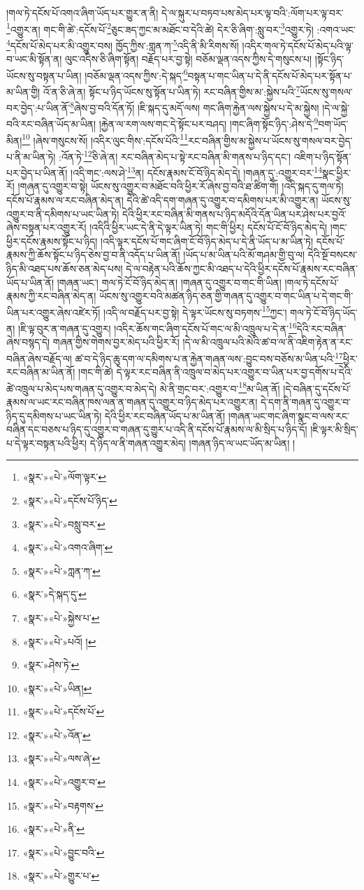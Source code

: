 །གལ་ཏེ་དངོས་པོ་འགའ་ཞིག་ཡོད་པར་གྱུར་ན་ནི། དེ་ལ་སྐུར་པ་བཏབ་པས་མེད་པར་ལྟ་བའི་:ལོག་པར་ལྟ་བར་\footnote{«སྣར་»«པེ་»ལོག་ལྟར་}འགྱུར་ན། གང་གི་ཚེ་:དངོས་པོ་\footnote{«སྣར་»«པེ་»དངོས་པོ་ཉིད་}ཅུང་ཟད་ཀྱང་མ་མཐོང་བ་དེའི་ཚེ། དེར་ཅི་ཞིག་:སླུ་བར་\footnote{«སྣར་»«པེ་»བསླུ་བར་}འགྱུར་ཏེ། :འགའ་ཡང་\footnote{«སྣར་»«པེ་»འགའ་ཞིག་}དངོས་པོ་མེད་པར་མི་འགྱུར་བས། ཁྱོད་ཀྱིས་:གླན་ཀ་\footnote{«སྣར་»«པེ་»ཀླན་ཀ་}འདི་ནི་མི་རིགས་སོ། །འདིར་གལ་ཏེ་དངོས་པོ་མེད་པའི་ལྟ་བ་ཡང་མི་སྟོན་ན། ལུང་འདིས་ཅི་ཞིག་སྟོན། བརྗོད་པར་བྱ་སྟེ། བཅོམ་ལྡན་འདས་ཀྱིས་དེ་གསུངས་པ། །སྟོང་ཉིད་ཡོངས་སུ་བསྟན་པ་ཡིན། །བཅོམ་ལྡན་འདས་ཀྱིས་:དེ་སྐད་\footnote{«སྣར་»དེ་སྐད་དུ་}བསྟན་པ་གང་ཡིན་པ་དེ་ནི་དངོས་པོ་མེད་པར་སྟོན་པ་མ་ཡིན་གྱི། འོ་ན་ཅི་ཞེ་ན། སྟོང་པ་ཉིད་ཡོངས་སུ་སྟོན་པ་ཡིན་ཏེ། རང་བཞིན་གྱིས་མ་:སྐྱེས་པའི་\footnote{«སྣར་»«པེ་»སྐྱེས་པ་}ཡོངས་སུ་གསལ་བར་བྱེད་:པ་ཡིན་ནོ་\footnote{«སྣར་»«པེ་»པའོ། །}ཞེས་བྱ་བའི་དོན་ཏོ། །ཇི་སྐད་དུ་མདོ་ལས། གང་ཞིག་རྐྱེན་ལས་སྐྱེས་པ་དེ་མ་སྐྱེས། །དེ་ལ་སྐྱེ་བའི་རང་བཞིན་ཡོད་མ་ཡིན། །རྐྱེན་ལ་རག་ལས་གང་དེ་སྟོང་པར་བཤད། །གང་ཞིག་སྟོང་ཉིད་:ཤེས་དེ་\footnote{«སྣར་»ཤེས་ཏེ་}བག་ཡོད་མིན།\footnote{«སྣར་»«པེ་»ཡིན།} །ཞེས་གསུངས་སོ། །འདིར་ལུང་གིས་:དངོས་པོའི་\footnote{«སྣར་»«པེ་»དངོས་པོ་}རང་བཞིན་གྱིས་མ་སྐྱེས་པ་ཡོངས་སུ་གསལ་བར་བྱེད་པ་ནི་མ་ཡིན་ཏེ། :འོན་ཏེ་\footnote{«སྣར་»«པེ་»འོན་}ཅི་ཞེ་ན། རང་བཞིན་མེད་པ་སྟེ་རང་བཞིན་མི་གནས་པ་ཉིད་དང་། འཇིག་པ་ཉིད་སྟོན་པར་བྱེད་པ་ཡིན་ནོ། །འདི་གང་:ལས་ཤེ་\footnote{«སྣར་»«པེ་»ལས་ཞེ་}ན། དངོས་རྣམས་ངོ་བོ་ཉིད་མེད་དེ། །གཞན་དུ་:འགྱུར་བར་\footnote{«སྣར་»«པེ་»འགྱུར་བ་}སྣང་ཕྱིར་རོ། །གཞན་དུ་འགྱུར་བ་སྟེ། ཡོངས་སུ་འགྱུར་བ་མཐོང་བའི་ཕྱིར་རོ་ཞེས་བྱ་བའི་ཐ་ཚིག་གོ། །འདི་སྐད་དུ་གལ་ཏེ། དངོས་པོ་རྣམས་ལ་རང་བཞིན་མེད་ན། དེའི་ཚེ་འདི་དག་གཞན་དུ་འགྱུར་བ་དམིགས་པར་མི་འགྱུར་ན། ཡོངས་སུ་འགྱུར་བ་ནི་དམིགས་པ་ཡང་ཡིན་ཏེ། དེའི་ཕྱིར་རང་བཞིན་མི་གནས་པ་ཉིད་མདོའི་དོན་ཡིན་པར་ཤེས་པར་བྱའོ་ཞེས་བསྟན་པར་འགྱུར་རོ། །འདིའི་ཕྱིར་ཡང་དེ་ནི་དེ་ལྟར་ཡིན་ཏེ། གང་གི་ཕྱིར། དངོས་པོ་ངོ་བོ་ཉིད་མེད་དེ། །གང་ཕྱིར་དངོས་རྣམས་སྟོང་པ་ཉིད། །འདི་ལྟར་དངོས་པོ་གང་ཞིག་ངོ་བོ་ཉིད་མེད་པ་དེ་ནི་ཡོད་པ་མ་ཡིན་ཏེ། དངོས་པོ་རྣམས་ཀྱི་ཆོས་སྟོང་པ་ཉིད་ཅེས་བྱ་བ་ནི་འདོད་པ་ཡིན་ནོ། །ཡོད་པ་མ་ཡིན་པའི་མོ་གཤམ་གྱི་བུ་ལ། དེའི་སྔོ་བསངས་ཉིད་མི་འཐད་པས་ཆོས་ཅན་མེད་པས། དེ་ལ་བརྟེན་པའི་ཆོས་ཀྱང་མི་འཐད་པ་དེའི་ཕྱིར་དངོས་པོ་རྣམས་རང་བཞིན་ཡོད་པ་ཡིན་ནོ། །གཞན་ཡང་། གལ་ཏེ་ངོ་བོ་ཉིད་མེད་ན། །གཞན་དུ་འགྱུར་བ་གང་གི་ཡིན། །གལ་ཏེ་དངོས་པོ་རྣམས་ཀྱི་རང་བཞིན་མེད་ན། ཡོངས་སུ་འགྱུར་བའི་མཚན་ཉིད་ཅན་གྱི་གཞན་དུ་འགྱུར་བ་གང་ཡིན་པ་དེ་གང་གི་ཡིན་པར་འགྱུར་ཞེས་འཛེར་ཏོ། །འདི་ལ་བརྗོད་པར་བྱ་སྟེ། དེ་ལྟར་ཡོངས་སུ་བཏགས་\footnote{«སྣར་»«པེ་»བརྟགས་}ཀྱང་། གལ་ཏེ་ངོ་བོ་ཉིད་ཡོད་ན། །ཇི་ལྟ་བུར་ན་གཞན་དུ་འགྱུར། །འདིར་ཆོས་གང་ཞིག་དངོས་པོ་གང་ལ་མི་འཁྲུལ་པ་དེ་ན་\footnote{«སྣར་»«པེ་»ནི་}དེའི་རང་བཞིན་ཞེས་བསྙད་དེ། གཞན་གྱིས་གེགས་བྱར་མེད་པའི་ཕྱིར་རོ། །དེ་ལ་མི་འཁྲུལ་པའི་མེའི་ཚ་བ་ལ་ནི་འཇིག་རྟེན་ན་རང་བཞིན་ཞེས་བརྗོད་ལ། ཚ་བ་དེ་ཉིད་ཆུ་དག་ལ་དམིགས་པ་ན་རྐྱེན་གཞན་ལས་:བྱུང་བས་བཅོས་མ་ཡིན་པའི་\footnote{«སྣར་»«པེ་»བྱུང་བའི་}ཕྱིར་རང་བཞིན་མ་ཡིན་ནོ། །གང་གི་ཚེ། དེ་ལྟར་རང་བཞིན་ནི་འཁྲུལ་བ་མེད་པར་འགྱུར་བ་ཡིན་པར་བྱ་དགོས་པ་དེའི་ཚེ་འཁྲུལ་པ་མེད་པས་གཞན་དུ་འགྱུར་བ་མེད་དེ། མེ་ནི་གྲང་བར་:འགྱུར་བ་\footnote{«སྣར་»«པེ་»གྱུར་པ་}མ་ཡིན་ནོ། །དེ་བཞིན་དུ་དངོས་པོ་རྣམས་ལ་ཡང་རང་བཞིན་ཁས་ལན་ན་གཞན་དུ་འགྱུར་བ་ཉིད་མེད་པར་འགྱུར་ན། དེ་དག་ནི་གཞན་དུ་འགྱུར་བ་ཉིད་དུ་དམིགས་པ་ཡང་ཡིན་ཏེ། དེའི་ཕྱིར་རང་བཞིན་ཡོད་པ་མ་ཡིན་ནོ། །གཞན་ཡང་གང་ཞིག་སྣང་བ་ལས་རང་བཞིན་དང་བཅས་པ་ཉིད་དུ་འགྱུར་བ་གཞན་དུ་གྱུར་པ་འདི་ནི་དངོས་པོ་རྣམས་ལ་མི་སྲིད་པ་ཉིད་དོ། །ཇི་ལྟར་མི་སྲིད་པ་དེ་ལྟར་བསྟན་པའི་ཕྱིར། དེ་ཉིད་ལ་ནི་གཞན་འགྱུར་མེད། །གཞན་ཉིད་ལ་ཡང་ཡོད་མ་ཡིན། །

